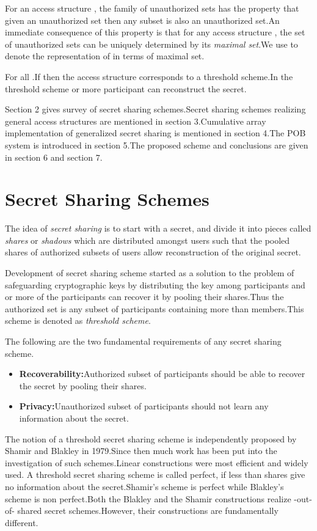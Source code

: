 \documentclass{llncs}
\begin{document}
For an access structure , the family of unauthorized sets  has the property that given an unauthorized set  then any subset  is also an unauthorized set.An immediate consequence of this property is that for any access structure , the set of unauthorized sets can be uniquely determined by its \textit{maximal set}.We use  to denote the representation of  in terms of maximal set.

For all .If  then the access structure corresponds to  a  threshold scheme.In the  threshold scheme  or more participant can reconstruct the secret.

Section 2 gives survey of secret sharing schemes.Secret sharing schemes realizing general access structures are mentioned
in section 3.Cumulative array implementation of generalized secret sharing is mentioned in section 4.The POB system is introduced in section 5.The proposed scheme and conclusions are given in section 6 and section 7.
\section{Secret Sharing Schemes}
The idea of \textit{ secret sharing} is to start with a secret, and divide it into pieces called \textit{shares} or \textit{shadows} which are distributed amongst users such that the pooled shares of authorized subsets of users allow reconstruction of the original secret.

Development of secret sharing scheme started as a solution to the problem of safeguarding cryptographic keys by distributing the key among  participants and  or more of the participants can recover it by pooling their shares.Thus the authorized set is any subset of participants containing more than  members.This scheme is denoted as  \textit{threshold scheme}.

The following are the two fundamental requirements of any secret sharing scheme.

\begin{itemize}
\item \textbf{Recoverability:}Authorized subset of participants should be able to recover the secret by pooling their shares.
\item \textbf{Privacy:}Unauthorized subset of participants should not learn any information about the secret.
\end{itemize}

The notion of a threshold secret sharing scheme is independently proposed by Shamir \cite{shamir1979} and Blakley \cite{blakley1979} in 1979.Since then much work has been put into the investigation of such schemes.Linear constructions were most efficient and widely used.
A threshold secret sharing scheme is called perfect, if less than  shares give no information about the secret.Shamir's scheme is perfect while Blakley's scheme is non perfect.Both the Blakley
and the Shamir constructions realize -out-of- shared secret schemes.However, their constructions are fundamentally different.
\end{document}
